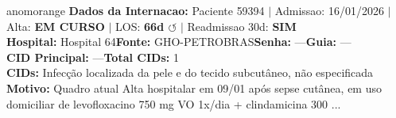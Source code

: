 \documentclass[a4paper,10pt]{article}
\begin{document}
\begin{anomalycard}[Internacao 162348 | GHO-PETROBRAS | ALTO (z=3.72)]{anomorange}
\textbf{Dados da Internacao:} Paciente 59394 $\mid$ Admissao: 16/01/2026 $\mid$ Alta: \textcolor{anomorange}{\textbf{EM CURSO}} $\mid$ LOS: \textbf{66d \textcolor{anomorange}{$\circlearrowleft$}} $\mid$ Readmissao 30d: \textcolor{anomred}{\textbf{SIM}}\\
\textbf{Hospital:} Hospital 64\quad\textbf{Fonte:} GHO-PETROBRAS\quad\textbf{Senha:} ---\quad\textbf{Guia:} ---\\
\textbf{CID Principal:} {\small ---}\quad\textbf{Total CIDs:} 1\\

\textbf{CIDs:} {\scriptsize Infecção localizada da pele e do tecido subcutâneo, não especificada}\\

\textbf{Motivo:} {\scriptsize Quadro atual Alta hospitalar em 09/01 após sepse cutânea, em uso domiciliar de levofloxacino 750 mg VO 1x/dia + clindamicina 300 ...}\\


\end{anomalycard}
\end{document}
